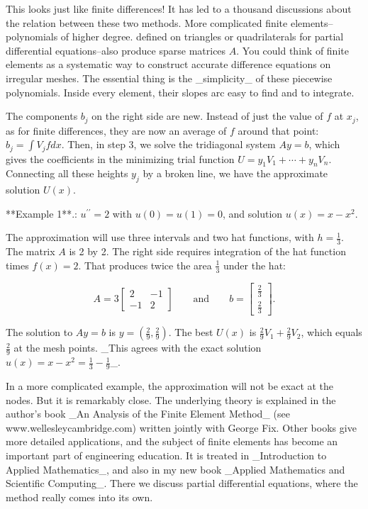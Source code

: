 This looks just like finite differences! It has led to a thousand discussions about the relation between these two methods. More complicated finite elements--polynomials of higher degree. defined on triangles or quadrilaterals for partial differential equations--also produce sparse matrices \(A\). You could think of finite elements as a systematic way to construct accurate difference equations on irregular meshes. The essential thing is the _simplicity_ of these piecewise polynomials. Inside every element, their slopes arc easy to find and to integrate.

The components \(b_{j}\) on the right side are new. Instead of just the value of \(f\) at \(x_{j}\), as for finite differences, they are now an average of \(f\) around that point: \(b_{j}=\int V_{j}fdx\). Then, in step 3, we solve the tridiagonal system \(Ay=b\), which gives the coefficients in the minimizing trial function \(U=y_{1}V_{1}+\cdots+y_{n}V_{n}\). Connecting all these heights \(y_{j}\) by a broken line, we have the approximate solution \(U(x)\).

**Example 1**.: \(u^{\prime\prime}=2\) with \(u(0)=u(1)=0\), and solution \(u(x)=x-x^{2}\).

The approximation will use three intervals and two hat functions, with \(h=\frac{1}{3}\). The matrix \(A\) is 2 by 2. The right side requires integration of the hat function times \(f(x)=2\). That produces twice the area \(\frac{1}{3}\) under the hat:

\[A=3\begin{bmatrix}2&-1\\ -1&2\end{bmatrix}\qquad\text{and}\qquad b=\begin{bmatrix}\frac{2}{3}\\ \frac{2}{3}\end{bmatrix}.\]

The solution to \(Ay=b\) is \(y=(\frac{2}{9},\frac{2}{9})\). The best \(U(x)\) is \(\frac{2}{9}V_{1}+\frac{2}{9}V_{2}\), which equals \(\frac{2}{9}\) at the mesh points. _This agrees with the exact solution \(u(x)=x-x^{2}=\frac{1}{3}-\frac{1}{9}\)_.

In a more complicated example, the approximation will not be exact at the nodes. But it is remarkably close. The underlying theory is explained in the author's book _An Analysis of the Finite Element Method_ (see www.wellesleycambridge.com) written jointly with George Fix. Other books give more detailed applications, and the subject of finite elements has become an important part of engineering education. It is treated in _Introduction to Applied Mathematics_, and also in my new book _Applied Mathematics and Scientific Computing_. There we discuss partial differential equations, where the method really comes into its own.

